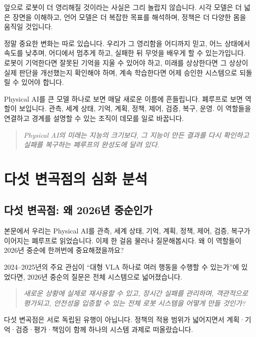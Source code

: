\documentclass[11pt,openany]{book}
\begin{document}
앞으로 로봇이 더 영리해질 것이라는 사실은 그리 놀랍지 않습니다. 시각 모델은 더 넓은 장면을 이해하고, 언어 모델은 더 복잡한 목표를 해석하며, 정책은 더 다양한 몸을 움직일 것입니다.

정말 중요한 변화는 따로 있습니다. 우리가 그 영리함을 어디까지 믿고, 어느 상태에서 속도를 낮추며, 어디에서 멈추게 하고, 실패한 뒤 무엇을 배우게 할 수 있는가입니다. 로봇이 기억한다면 잘못된 기억을 지울 수 있어야 하고, 미래를 상상한다면 그 상상이 실제 판단을 개선했는지 확인해야 하며, 계속 학습한다면 어제 승인한 시스템으로 되돌릴 수 있어야 합니다.

Physical AI를 큰 모델 하나로 보면 매달 새로운 이름에 흔들립니다. 폐루프로 보면 역할이 보입니다. 관측, 세계 상태, 기억, 계획, 정책, 제어, 검증, 복구, 운영. 이 역할들을 연결하고 경계를 설명할 수 있는 조직이 데모를 일로 바꿉니다.

\begin{quote}
\large\itshape
Physical AI의 미래는 지능의 크기보다, 그 지능이 만든 결과를 다시 확인하고 실패를 복구하는 폐루프의 완성도에 달려 있다.
\end{quote}

\cleardoublepage
\part*{다섯 변곡점의 심화 분석}

\chapter*{다섯 변곡점: 왜 2026년 중순인가}

본문에서 우리는 Physical AI를 관측, 세계 상태, 기억, 계획, 정책, 제어, 검증, 복구가 이어지는 폐루프로 읽었습니다. 이제 한 걸음 물러나 질문해봅시다. 왜 이 역할들이 2026년 중순에 한꺼번에 중요해졌을까요?

2024--2025년의 주요 관심이 ``대형 VLA 하나로 여러 행동을 수행할 수 있는가''에 있었다면, 2026년 중순의 질문은 전체 시스템으로 넓어졌습니다.

\begin{quote}
\large\itshape
새로운 상황에 실제로 재사용할 수 있고, 장시간 실패를 관리하며, 객관적으로 평가되고, 안전성을 입증할 수 있는 전체 로봇 시스템을 어떻게 만들 것인가?
\end{quote}

다섯 변곡점은 서로 독립된 유행이 아닙니다. 정책의 적용 범위가 넓어지면서 계획·기억·검증·평가·책임이 함께 하나의 시스템 과제로 떠올랐습니다.
\end{document}
